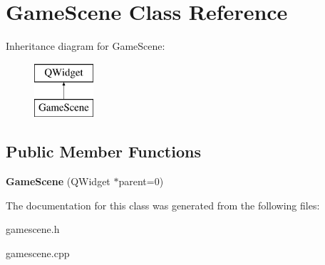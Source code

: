 \hypertarget{class_game_scene}{}\section{Game\+Scene Class Reference}
\label{class_game_scene}
Inheritance diagram for Game\+Scene\+:\begin{figure}[H]
\begin{center}
\leavevmode
\includegraphics[height=2.000000cm]{class_game_scene}
\end{center}
\end{figure}
\subsection*{Public Member Functions}
\begin{DoxyCompactItemize}
\item 
\hypertarget{class_game_scene_a91121a74fe510cb6bf5d24f4ca31c64a}{}{\bfseries Game\+Scene} (Q\+Widget $\ast$parent=0)\label{class_game_scene_a91121a74fe510cb6bf5d24f4ca31c64a}

\end{DoxyCompactItemize}


The documentation for this class was generated from the following files\+:\begin{DoxyCompactItemize}
\item 
gamescene.\+h\item 
gamescene.\+cpp\end{DoxyCompactItemize}
